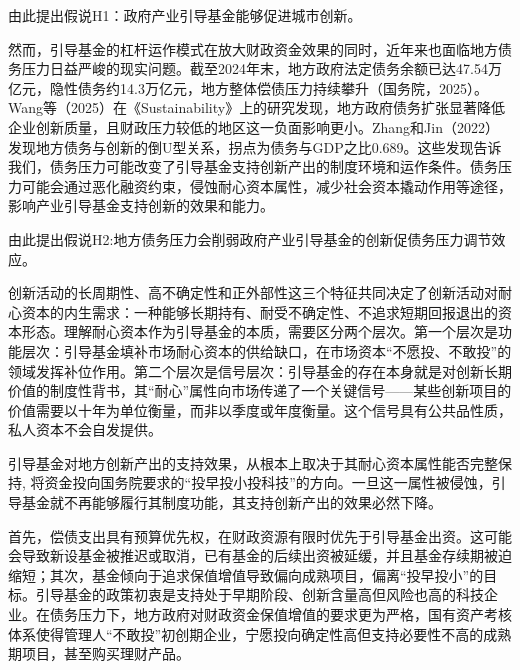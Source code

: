 由此提出假说H1：政府产业引导基金能够促进城市创新。

然而，引导基金的杠杆运作模式在放大财政资金效果的同时，近年来也面临地方债务压力日益严峻的现实问题。截至2024年末，地方政府法定债务余额已达47.54万亿元，隐性债务约14.3万亿元，地方整体偿债压力持续攀升（国务院，2025）。Wang等（2025）在《Sustainability》上的研究发现，地方政府债务扩张显著降低企业创新质量，且财政压力较低的地区这一负面影响更小。Zhang和Jin（2022）发现地方债务与创新的倒U型关系，拐点为债务与GDP之比0.689。这些发现告诉我们，债务压力可能改变了引导基金支持创新产出的制度环境和运作条件。债务压力可能会通过恶化融资约束，侵蚀耐心资本属性，减少社会资本撬动作用等途径，影响产业引导基金支持创新的效果和能力。

由此提出假说H2:地方债务压力会削弱政府产业引导基金的创新促债务压力调节效应。

创新活动的长周期性、高不确定性和正外部性这三个特征共同决定了创新活动对耐心资本的内生需求：一种能够长期持有、耐受不确定性、不追求短期回报退出的资本形态。理解耐心资本作为引导基金的本质，需要区分两个层次。第一个层次是功能层次：引导基金填补市场耐心资本的供给缺口，在市场资本“不愿投、不敢投”的领域发挥补位作用。第二个层次是信号层次：引导基金的存在本身就是对创新长期价值的制度性背书，其“耐心”属性向市场传递了一个关键信号——某些创新项目的价值需要以十年为单位衡量，而非以季度或年度衡量。这个信号具有公共品性质，私人资本不会自发提供。

引导基金对地方创新产出的支持效果，从根本上取决于其耐心资本属性能否完整保持, 将资金投向国务院要求的“投早投小投科技”的方向。一旦这一属性被侵蚀，引导基金就不再能够履行其制度功能，其支持创新产出的效果必然下降。

首先，偿债支出具有预算优先权，在财政资源有限时优先于引导基金出资。这可能会导致新设基金被推迟或取消，已有基金的后续出资被延缓，并且基金存续期被迫缩短；其次，基金倾向于追求保值增值导致偏向成熟项目，偏离“投早投小”的目标。引导基金的政策初衷是支持处于早期阶段、创新含量高但风险也高的科技企业。在债务压力下，地方政府对财政资金保值增值的要求更为严格，国有资产考核体系使得管理人“不敢投”初创期企业，宁愿投向确定性高但支持必要性不高的成熟期项目，甚至购买理财产品。

